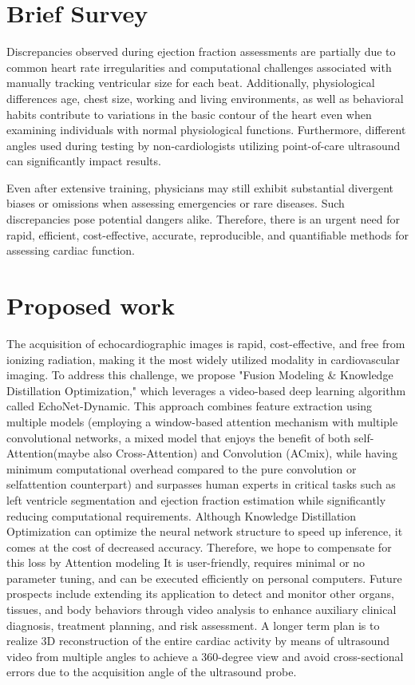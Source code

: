 \section{Brief Survey}
\label{sec:intro}

Discrepancies observed during ejection fraction assessments are partially due to common heart rate irregularities and computational challenges associated with manually tracking ventricular size for each beat. Additionally, physiological differences age, chest size, working and living environments, as well as behavioral habits contribute to variations in the basic contour of the heart even when examining individuals with normal physiological functions. Furthermore, different angles used during testing by non-cardiologists utilizing point-of-care ultrasound can significantly impact results.

Even after extensive training, physicians may still exhibit substantial divergent biases or omissions when assessing emergencies or rare diseases. Such discrepancies pose potential dangers alike. Therefore, there is an urgent need for rapid, efficient, cost-effective, accurate, reproducible, and quantifiable methods for assessing cardiac function.

\section{Proposed work}
The acquisition of echocardiographic images is rapid, cost-effective, and free from ionizing radiation, making it the most widely utilized modality in cardiovascular imaging. To address this challenge, we propose "Fusion Modeling \& Knowledge Distillation Optimization," which leverages a video-based deep learning algorithm called EchoNet-Dynamic. This approach combines feature extraction using multiple models (employing a window-based attention mechanism with multiple convolutional networks, a mixed model that enjoys the benefit of both self-Attention(maybe also Cross-Attention) and Convolution (ACmix), while having minimum computational overhead compared to the pure convolution or selfattention counterpart) and surpasses human experts in critical tasks such as left ventricle segmentation and ejection fraction estimation while significantly reducing computational requirements. Although Knowledge Distillation Optimization can optimize the neural network structure to speed up inference, it comes at the cost of decreased accuracy. Therefore, we hope to compensate for this loss by Attention modeling It is user-friendly, requires minimal or no parameter tuning, and can be executed efficiently on personal computers. Future prospects include extending its application to detect and monitor other organs, tissues, and body behaviors through video analysis to enhance auxiliary clinical diagnosis, treatment planning, and risk assessment. A longer term plan is to realize 3D reconstruction of the entire cardiac activity by means of ultrasound video from multiple angles to achieve a 360-degree view and avoid cross-sectional errors due to the acquisition angle of the ultrasound probe.
